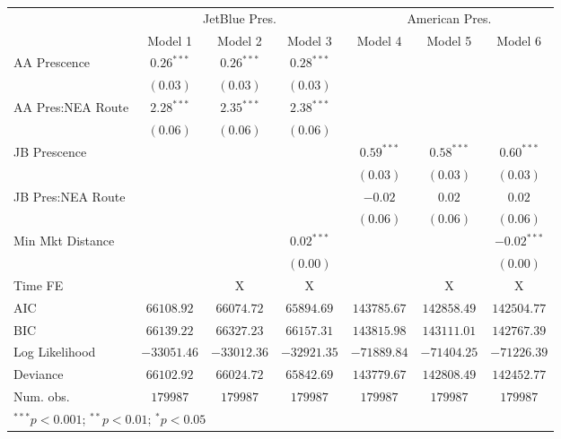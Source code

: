 
\begin{tabular}{l c c c c c c}
\hline
 & \multicolumn{3}{c}{JetBlue Pres.} & \multicolumn{3}{c}{American Pres.} \\
\cline{2-4} \cline{5-7}
 & Model 1 & Model 2 & Model 3 & Model 4 & Model 5 & Model 6 \\
\hline
AA Prescence      & $0.26^{***}$ & $0.26^{***}$ & $0.28^{***}$ &              &              &               \\
                  & $(0.03)$     & $(0.03)$     & $(0.03)$     &              &              &               \\
AA Pres:NEA Route & $2.28^{***}$ & $2.35^{***}$ & $2.38^{***}$ &              &              &               \\
                  & $(0.06)$     & $(0.06)$     & $(0.06)$     &              &              &               \\
JB Prescence      &              &              &              & $0.59^{***}$ & $0.58^{***}$ & $0.60^{***}$  \\
                  &              &              &              & $(0.03)$     & $(0.03)$     & $(0.03)$      \\
JB Pres:NEA Route &              &              &              & $-0.02$      & $0.02$       & $0.02$        \\
                  &              &              &              & $(0.06)$     & $(0.06)$     & $(0.06)$      \\
Min Mkt Distance  &              &              & $0.02^{***}$ &              &              & $-0.02^{***}$ \\
                  &              &              & $(0.00)$     &              &              & $(0.00)$      \\
\hline
Time FE           &              & X            & X            &              & X            & X             \\
AIC               & $66108.92$   & $66074.72$   & $65894.69$   & $143785.67$  & $142858.49$  & $142504.77$   \\
BIC               & $66139.22$   & $66327.23$   & $66157.31$   & $143815.98$  & $143111.01$  & $142767.39$   \\
Log Likelihood    & $-33051.46$  & $-33012.36$  & $-32921.35$  & $-71889.84$  & $-71404.25$  & $-71226.39$   \\
Deviance          & $66102.92$   & $66024.72$   & $65842.69$   & $143779.67$  & $142808.49$  & $142452.77$   \\
Num. obs.         & $179987$     & $179987$     & $179987$     & $179987$     & $179987$     & $179987$      \\
\hline
\multicolumn{7}{l}{\scriptsize{$^{***}p<0.001$; $^{**}p<0.01$; $^{*}p<0.05$}}
\end{tabular}
